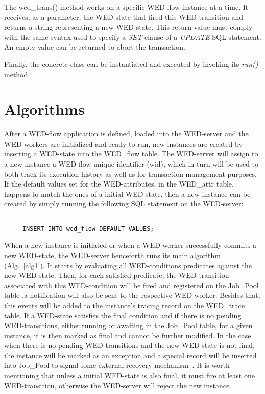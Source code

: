 \documentclass[12pt]{article}
\begin{document}
The wed\_trans() method works on a specific WED-flow instance at a time. It receives, as a parameter, the WED-state that 
fired this WED-transition and returns a string representing a new WED-state. This return value must comply with the same
syntax used to specify a \emph{SET} clause of a \emph{UPDATE} SQL statement. An empty value can be returned to abort the
transaction.

\par Finally, the concrete class can be instantiated and executed by invoking its \emph{run()} method.

\section{Algorithms}

After a WED-flow application is defined, loaded into the WED-server and the WED-workers are initialized and ready to run,
new instances are created by inserting a WED-state into the WED\_flow table. The WED-server will assign to a new instance 
a WED-flow unique identifier (wid), which in turn will be used to both track its execution history as well as for transaction
management purposes. If the default values set for the WED-attributes, in the WED\_attr table, happens to match the ones
of a initial WED-state, then a new instance can be created by simply running the following SQL statement on the WED-server:

\begin{Verbatim}[fontsize=\small]

     INSERT INTO wed_flow DEFAULT VALUES;
\end{Verbatim}

When a new instance is initiated or when a WED-worker successfully commits a new WED-state, the WED-server henceforth runs 
its main algorithm (Alg.~\ref{alg1}). It starts by evaluating all WED-conditions predicates against the new WED-state. Then, for
each satisfied predicate, the WED-transition associated with this WED-condition will be fired and registered on the Job\_Pool table
,a notification will also be sent to the respective WED-worker. Besides that, this events will be added to the instance's
tracing record on the WED\_trace table. If a WED-state satisfies the final condition and if there is no pending WED-transitions,
either running or awaiting in the Job\_Pool table, for a given instance, it is then marked as final and cannot be further
modified. In the case when there is no pending WED-transitions and the new WED-state is not final, the instance will be
marked as an exception and a special record will be inserted into Job\_Pool to signal some external recovery mechanism~\cite{ICWS12}.
It is worth mentioning that unless a initial WED-state is also final, it must fire 
at least one WED-transition, otherwise the WED-server will reject the new instance. 
\end{document}
